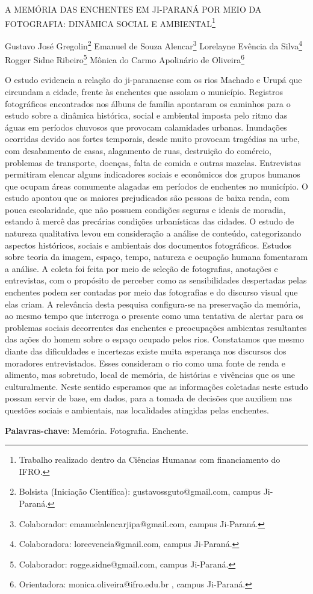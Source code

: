 \documentclass[article,12pt,onesidea,4paper,english,brazil]{abntex2}
\begin{document}
	
	
	\frenchspacing 
	
	\begin{center}
		\LARGE A MEMÓRIA DAS ENCHENTES EM JI-PARANÁ POR MEIO DA FOTOGRAFIA: DINÂMICA SOCIAL E AMBIENTAL\footnote{Trabalho realizado dentro da Ciências Humanas com financiamento do IFRO.}
		
		\normalsize
		Gustavo José Gregolin\footnote{Bolsista (Iniciação Científica): gustavossguto@gmail.com, campus Ji-Paraná.} 
		Emanuel de Souza Alencar\footnote{Colaborador: emanuelalencarjipa@gmail.com, campus Ji-Paraná.} 
		Lorelayne Evência da Silva\footnote{Colaboradora: loreevencia@gmail.com, campus Ji-Paraná.} 
		Rogger Sidne Ribeiro\footnote{Colaborador: rogge.sidne@gmail.com, campus Ji-Paraná.}
		Mônica do Carmo Apolinário de Oliveira\footnote{Orientadora: monica.oliveira@ifro.edu.br , campus Ji-Paraná.} 
	\end{center}
	
	\noindent O estudo evidencia a relação do ji-paranaense com os rios Machado e Urupá que
	circundam a cidade, frente às enchentes que assolam o município. Registros
	fotográficos encontrados nos álbuns de família apontaram os caminhos para o
	estudo sobre a dinâmica histórica, social e ambiental imposta pelo ritmo das águas
	em períodos chuvosos que provocam calamidades urbanas. Inundações ocorridas
	devido aos fortes temporais, desde muito provocam tragédias na urbe, com
	desabamento de casas, alagamento de ruas, destruição do comércio, problemas de
	transporte, doenças, falta de comida e outras mazelas. Entrevistas permitiram
	elencar alguns indicadores sociais e econômicos dos grupos humanos que ocupam
	áreas comumente alagadas em períodos de enchentes no município. O estudo
	apontou que os maiores prejudicados são pessoas de baixa renda, com pouca
	escolaridade, que não possuem condições seguras e ideais de moradia, estando à
	mercê das precárias condições urbanísticas das cidades. O estudo de natureza
	qualitativa levou em consideração a análise de conteúdo, categorizando aspectos
	históricos, sociais e ambientais dos documentos fotográficos. Estudos sobre teoria
	da imagem, espaço, tempo, natureza e ocupação humana fomentaram a análise. A
	coleta foi feita por meio de seleção de fotografias, anotações e entrevistas, com o
	propósito de perceber como as sensibilidades despertadas pelas enchentes podem
	ser contadas por meio das fotografias e do discurso visual que elas criam. A
	relevância desta pesquisa configura-se na preservação da memória, ao mesmo
	tempo que interroga o presente como uma tentativa de alertar para os problemas
	sociais decorrentes das enchentes e preocupações ambientas resultantes das ações
	do homem sobre o espaço ocupado pelos rios. Constatamos que mesmo diante das
	dificuldades e incertezas existe muita esperança nos discursos dos moradores
	entrevistados. Esses consideram o rio como uma fonte de renda e alimento, mas
	sobretudo, local de memória, de histórias e vivências que os une culturalmente.
	Neste sentido esperamos que as informações coletadas neste estudo possam servir
	de base, em dados, para a tomada de decisões que auxiliem nas questões sociais e
	ambientais, nas localidades atingidas pelas enchentes.
	
	\vspace{\onelineskip}
	
	\noindent
	\textbf{Palavras-chave}: Memória. Fotografia. Enchente.
	
\end{document}
